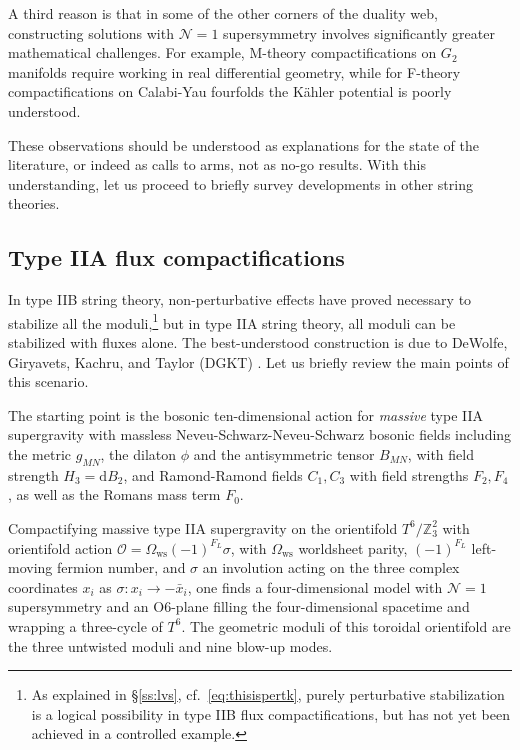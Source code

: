 \documentclass[12pt,a4wide]{article}
\def\d{\mathrm{d}}
\def\O{\mathcal{O}}
\begin{document}
A third reason is that in some of the other corners of the duality web, constructing solutions with $\mathcal{N}=1$ supersymmetry involves 
significantly greater mathematical challenges.
For example, M-theory compactifications on $G_2$ manifolds require working in real differential geometry, while for F-theory compactifications on Calabi-Yau fourfolds the K\"ahler potential is poorly understood.

These observations should be understood as explanations for the state of the literature, or indeed as calls to arms, not as no-go results.  With this understanding, let us proceed to briefly survey developments in other string theories.
 

\subsection{Type IIA flux compactifications}

In type IIB string theory, non-perturbative effects have proved necessary to stabilize all the moduli,\footnote{As explained in \S\ref{ss:lvs}, cf.~\eqref{eq:thisispertk}, purely perturbative stabilization is a logical possibility in type IIB flux compactifications, but has not yet been achieved in a controlled example.} but in type IIA string theory,  
all moduli can be stabilized with fluxes alone. 
The best-understood construction is due to DeWolfe, Giryavets, Kachru, and Taylor (DGKT) \cite{DeWolfe:2005uu}. Let us briefly review the main points of this scenario.

The starting point is the bosonic ten-dimensional action for \emph{massive} type IIA supergravity with massless Neveu-Schwarz-Neveu-Schwarz bosonic fields including  the metric 
 $g_{MN}$, the dilaton $\phi$ and the antisymmetric tensor $ B_{MN}$,  with field strength $H_3= \d B_2$, and Ramond-Ramond fields $C_1, C_3$ with field strengths $F_2, F_4$, as well as the Romans mass term $F_0$. 

Compactifying massive type IIA supergravity on the orientifold $T^6/\mathbb Z_3^2$ with orientifold action $\O=\Omega_{\text{ws}} (-1)^{F_L}\sigma$, with $\Omega_{\text{ws}}$ worldsheet parity, $(-1)^{F_L}$ left-moving fermion number, and $\sigma$ an involution acting on the three complex coordinates $x_i$ as $\sigma: x_i\rightarrow - \bar x_i$, one finds 
a four-dimensional model with $\mathcal{N}=1$ supersymmetry and an O6-plane filling the four-dimensional spacetime and wrapping a three-cycle of $T^6$. 
The geometric moduli of this toroidal orientifold
are the three untwisted moduli and nine blow-up modes.
\end{document}

